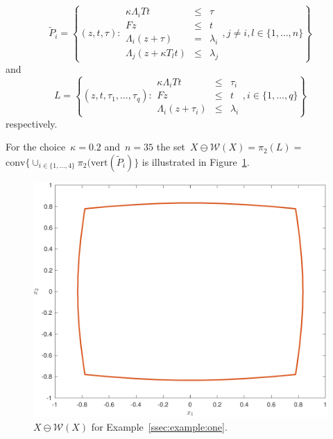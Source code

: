 \documentclass[final]{elsarticle}
\providecommand{\conv}{\text{conv}}
\theoremstyle{remark}
\theoremstyle{definition}
\begin{document}
$$
\tilde P_i= \left\{(z,t,\tau): \begin{array}{rcl}\kappa\Lambda_i Tt &\leq& \tau\\ Fz&\leq& t\\ \Lambda_i(z+\tau)&=&\lambda_i\\ \Lambda_j(z+\kappa T_lt)&\leq&\lambda_j\end{array},j\neq i,l\in\{1,\dots,n\}\right\}
$$
%
and
$$
L = \left\{(z,t,\tau_1,\dots,\tau_q):\begin{array}{rcl}
\kappa\Lambda_i Tt & \leq &\tau_i\\
Fz &\leq& t\\
\Lambda_i(z+\tau_i)&\leq&\lambda_i
\end{array},i\in\{1,\dots,q\}\right\}
$$
%
respectively.

For the choice~$\kappa=0.2$ and~$n = 35$ the set~$X\ominus\mathcal W(X)=\pi_2(L)=$\linebreak $\conv\{\cup_{i\in\{1,\dots,4\}}\pi_2(\text{vert}(\tilde P_i)\}$ is illustrated in Figure~\ref{fig:example:parametric:pontryagin:difference}.

\begin{figure}
\centering
\includegraphics[width=.95\textwidth]{parametricPD.pdf}
\caption{$X\ominus\mathcal W(X)$ for Example~\ref{ssec:example:one}.}
\label{fig:example:parametric:pontryagin:difference}
\end{figure}
\end{document}
